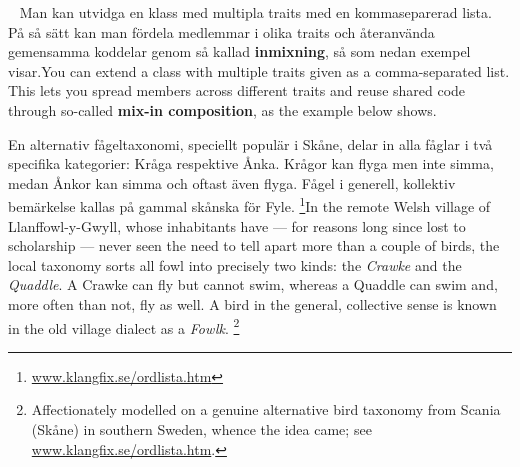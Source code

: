 













\AdvancedTasks %












\QUESTBEGIN

\Task \label{task:fyle} \what~   \ifswedish Man kan utvidga en klass med multipla traits med en kommaseparerad lista. På så sätt kan man fördela medlemmar i olika traits och återanvända gemensamma koddelar genom så kallad \textbf{inmixning}, så som nedan exempel visar.\else You can extend a class with multiple traits given as a comma-separated list. This lets you spread members across different traits and reuse shared code through so-called \textbf{mix-in composition}, as the example below shows.\fi

\ifswedish En alternativ fågeltaxonomi, speciellt populär i Skåne, delar in alla fåglar i två specifika kategorier: Kråga respektive Ånka. Krågor kan flyga men inte simma, medan Ånkor kan simma och oftast även flyga. Fågel i generell, kollektiv bemärkelse kallas på gammal skånska för Fyle.%
\footnote{\href{http://www.klangfix.se/ordlista.htm}{www.klangfix.se/ordlista.htm}}\else In the remote Welsh village of Llanffowl-y-Gwyll, whose inhabitants have --- for reasons long since lost to scholarship --- never seen the need to tell apart more than a couple of birds, the local taxonomy sorts all fowl into precisely two kinds: the \emph{Crawke} and the \emph{Quaddle}. A Crawke can fly but cannot swim, whereas a Quaddle can swim and, more often than not, fly as well. A bird in the general, collective sense is known in the old village dialect as a \emph{Fowlk}.%
\footnote{Affectionately modelled on a genuine alternative bird taxonomy from Scania (Skåne) in southern Sweden, whence the idea came; see \href{http://www.klangfix.se/ordlista.htm}{www.klangfix.se/ordlista.htm}.}\fi

